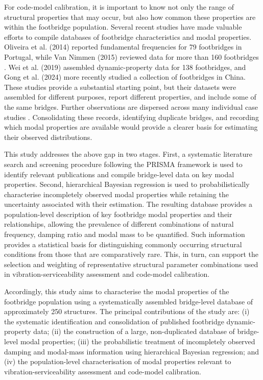 \documentclass[preprint,a4paper,12pt]{elsarticle}
\begin{document}
For code-model calibration, it is important to know not only the range of structural properties that may occur, but also how common these properties are within the footbridge population.
Several recent studies have made valuable efforts to compile databases of footbridge characteristics and modal properties. Oliveira et al. (2014) \cite{oliveira2014fundamental} reported fundamental frequencies for 79 footbridges in Portugal, while Van Nimmen (2015) reviewed data for more than 160 footbridges \cite{vanNimmen2015,zall2018}.
Wei et al. (2019) \cite{wei2019measured} assembled dynamic-property data for 138 footbridges, and Gong et al. (2024) \cite{gong2024basic} more recently studied a collection of footbridges in China.
These studies provide a substantial starting point, but their datasets were assembled for different purposes, report different properties, and include some of the same bridges.
Further observations are dispersed across many individual case studies \cite{vzivanovic2005human,tadeu2022vibration,lievens2016robust,strobbe2026vibration}.
Consolidating these records, identifying duplicate bridges, and recording which modal properties are available would provide a clearer basis for estimating their observed distributions.

This study addresses the above gap in two stages.
First, a systematic literature search and screening procedure following the PRISMA framework is used to identify relevant publications and compile bridge-level data on key modal properties.
Second, hierarchical Bayesian regression is used to probabilistically characterise incompletely observed modal properties while retaining the uncertainty associated with their estimation.
The resulting database provides a population-level description of key footbridge modal properties and their relationships, allowing the prevalence of different combinations of natural frequency, damping ratio and modal mass to be quantified.
Such information provides a statistical basis for distinguishing commonly occurring structural conditions from those that are comparatively rare.
This, in turn, can support the selection and weighting of representative structural parameter combinations used in vibration-serviceability assessment and code-model calibration.

Accordingly, this study aims to characterise the modal properties of the footbridge population using a systematically assembled bridge-level database of approximately 250 structures.
The principal contributions of the study are: (i) the systematic identification and consolidation of published footbridge dynamic-property data; (ii) the construction of a large, non-duplicated database of bridge-level modal properties; (iii) the probabilistic treatment of incompletely observed damping and modal-mass information using hierarchical Bayesian regression; and (iv) the population-level characterisation of modal properties relevant to vibration-serviceability assessment and code-model calibration.
\end{document}
